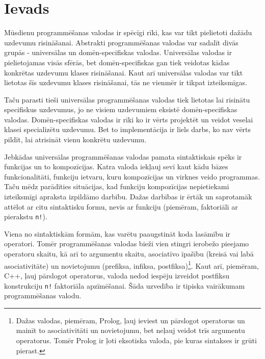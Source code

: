 \section*{\label{s:introduction}Ievads}

Mūsdienu programmēšanas valodas ir spēcīgi rīki, kas var tikt pielietoti dažādu uzdevumu risināšanai. Abstrakti programmēšanas valodas var sadalīt divās grupās - universālas un domēn-specifiskas valodas. Universālas valodas ir pielietojamas visās sfērās, bet domēn-specifiskas gan tiek veidotas kādas konkrētas uzdevumu klases risināšanai. Kaut arī universālas valodas var tikt lietotas šīs uzdevumu klases risināšanai, tās ne vienmēr ir tikpat izteiksmīgas.

Taču parasti tieši universālas programmēšanas valodas tiek lietotas lai risinātu specifiskus uzdevumus, jo ne visiem uzdevumiem eksistē domēn-specifiskas valodas. Domēn-specifiskas valodas ir rīki ko ir vērts projektēt un veidot veselai klasei specializētu uzdevumu. Bet to implementācija ir liels darbs, ko nav vērts pildīt, lai atrisināt vienu konkrētu uzdevumu.

Jebkādas universālas programmēšanas valodas pamata sintaktiskais spēks ir funkcijas un to kompozīcijas. Katra valoda iekļauj sevī kaut kādu bāzes funkcionalitāti, funkciju ietvaru, kuru kompozīcijas un virknes veido programmas. Taču mēdz parādīties situācijas, kad funkciju kompozīcijas nepietiekami izteiksmīgi apraksta izpildāmo darbību. Dažas darbības ir ērtāk un saprotamāk attēlot ar citu sintaktisku formu, nevis ar funkciju (piemēram, faktoriāli ar pierakstu \verb|n!|).

Viena no sintaktiskām formām, kas varētu paaugstināt koda lasāmību ir operatori. Tomēr programmēšanas valodas bieži vien stingri ierobežo pieejamo operatoru skaitu, kā arī to argumentu skaitu, asociatīvo īpašību (kreisā vai labā asociativitāte) un novietojumu (prefiksa, infiksa, postfiksa)\footnote{Dažas valodas, piemēram, Prolog, ļauj ieviest un pārslogot operatorus un mainīt to asociativitāti un novietojumu, bet neļauj veidot trīs argumentu operatorus. Tomēr Prolog ir ļoti eksotiska valoda, pie kuras sintakses ir grūti pierast.\cite{PrologStandard}}. Kaut arī, piemēram, C++, ļauj pārslogot operatorus, valoda nedod iespēju izveidot postfiksu konstrukciju \verb|n!| faktoriāla apzīmēšanai. Šāda uzvedība ir tipiska vairākumam programmēšanas valodu. %

